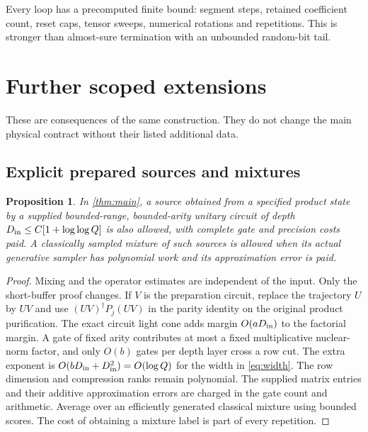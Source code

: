 \documentclass[11pt,reqno]{amsart}
\numberwithin{equation}{section}
\newtheorem{proposition}[theorem]{Proposition}
\theoremstyle{definition}
\theoremstyle{remark}
\begin{document}
Every loop has a precomputed finite bound: segment steps, retained coefficient count, reset caps, tensor sweeps, numerical rotations and repetitions. This is stronger than almost-sure termination with an unbounded random-bit tail.


\section{Further scoped extensions}\label{app:extensions}

These are consequences of the same construction. They do not change the main physical contract without their listed additional data.

\subsection{Explicit prepared sources and mixtures}
\begin{proposition}\label{prop:prepared}
In \cref{thm:main}, a source obtained from a specified product state by a supplied bounded-range, bounded-arity unitary circuit of depth
$D_{\rm in}\leq C[1+\log\log Q]$ is also allowed, with complete gate and precision costs paid. A classically sampled mixture of such sources is allowed when its actual generative sampler has polynomial work and its approximation error is paid.
\end{proposition}
\begin{proof}
Mixing and the operator estimates are independent of the input. Only the short-buffer proof changes. If $V$ is the preparation circuit, replace the trajectory $U$ by $UV$ and use $(UV)^\dagger P_j(UV)$ in the parity identity on the original product purification. The exact circuit light cone adds margin $O(aD_{\rm in})$ to the factorial margin. A gate of fixed arity contributes at most a fixed multiplicative nuclear-norm factor, and only $O(b)$ gates per depth layer cross a row cut. The extra exponent is $O(bD_{\rm in}+D_{\rm in}^2)=O(\log Q)$ for the width in \eqref{eq:width}. The row dimension and compression ranks remain polynomial. The supplied matrix entries and their additive approximation errors are charged in the gate count and arithmetic. Average over an efficiently generated classical mixture using bounded scores. The cost of obtaining a mixture label is part of every repetition.
\end{proof}
\end{document}
